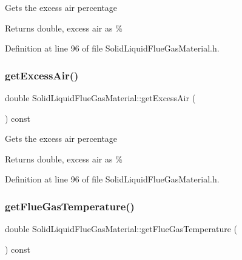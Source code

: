 Gets the excess air percentage \begin{DoxyReturn}{Returns}
double, excess air as \% 
\end{DoxyReturn}


Definition at line 96 of file Solid\+Liquid\+Flue\+Gas\+Material.\+h.

\mbox{\label{class_solid_liquid_flue_gas_material_a49e7bb4ebc45897c81b6f38610ceaf02}} 
\subsubsection{\texorpdfstring{get\+Excess\+Air()}{getExcessAir()}\hspace{0.1cm}{\footnotesize\ttfamily [3/3]}}
{\footnotesize\ttfamily double Solid\+Liquid\+Flue\+Gas\+Material\+::get\+Excess\+Air (\begin{DoxyParamCaption}{ }\end{DoxyParamCaption}) const\hspace{0.3cm}{\ttfamily [inline]}}

Gets the excess air percentage \begin{DoxyReturn}{Returns}
double, excess air as \% 
\end{DoxyReturn}


Definition at line 96 of file Solid\+Liquid\+Flue\+Gas\+Material.\+h.

\mbox{\label{class_solid_liquid_flue_gas_material_aba4604158b3c624496d7de4b5fb511e2}} 
\subsubsection{\texorpdfstring{get\+Flue\+Gas\+Temperature()}{getFlueGasTemperature()}\hspace{0.1cm}{\footnotesize\ttfamily [1/3]}}
{\footnotesize\ttfamily double Solid\+Liquid\+Flue\+Gas\+Material\+::get\+Flue\+Gas\+Temperature (\begin{DoxyParamCaption}{ }\end{DoxyParamCaption}) const\hspace{0.3cm}{\ttfamily [inline]}}

